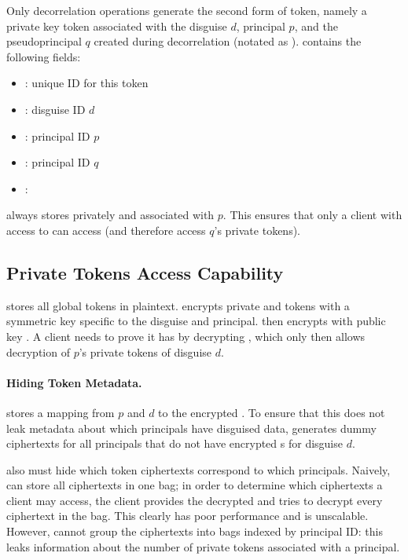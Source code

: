 Only decorrelation operations generate the second form of token, namely a private key token associated with the disguise $d$, principal $p$, and the pseudoprincipal $q$ created
during decorrelation (notated as ).
 contains the following fields:
\begin{itemize}
\item {}: unique ID for this token
\item {}: disguise ID $d$ 
\item {}: principal ID $p$
\item {}: principal ID $q$
\item {}: 
\end{itemize}
\sys always stores  privately and associated with $p$. This ensures that only a client
with access to  can access  (and therefore access $q$'s private tokens).

\subsection{Private Tokens Access Capability}
\sys stores all global  tokens in plaintext.
\sys encrypts private  and  tokens with a symmetric key  specific to the
disguise and principal. \sys then encrypts  with public key . A client needs to prove it has
 by decrypting , which only then allows decryption of $p$'s private tokens of
disguise $d$.

\paragraph{Hiding Token Metadata.}
\sys stores a mapping from $p$ and $d$ to the encrypted . To ensure that this does not leak
metadata about which principals have disguised data, \sys generates dummy ciphertexts for all
principals that do not have encrypted s for disguise $d$.

\sys also must hide which token ciphertexts correspond to which principals.  Naively, \sys can store
all ciphertexts in one bag; in order to determine which ciphertexts a client may access, the client
provides the decrypted  and \sys tries to decrypt every ciphertext in the bag. This clearly
has poor performance and is unscalable.
However, \sys cannot group the ciphertexts into bags indexed by principal ID: this leaks information
about the number of private tokens associated with a principal.

